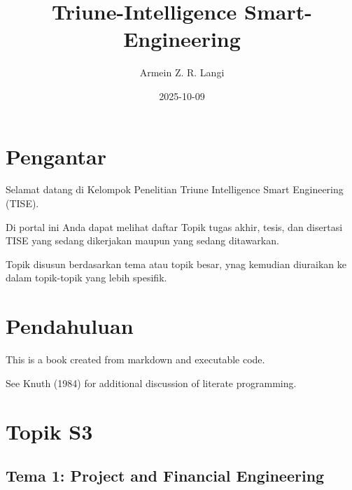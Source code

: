 \documentclass[
  letterpaper,
  DIV=11,
  numbers=noendperiod]{scrreprt}
\title{Triune-Intelligence Smart-Engineering}
\author{Armein Z. R. Langi}
\date{2025-10-09}
\renewcommand*\contentsname{Table of contents}
\newcommand\contentsname{Table of contents}
\begin{document}
\maketitle

\renewcommand*\contentsname{Table of contents}
{
\hypersetup{linkcolor=}
\setcounter{tocdepth}{2}
\tableofcontents
}


\chapter*{Pengantar}\label{pengantar}


Selamat datang di Kelompok Penelitian Triune Intelligence Smart
Engineering (TISE).

Di portal ini Anda dapat melihat daftar Topik tugas akhir, tesis, dan
disertasi TISE yang sedang dikerjakan maupun yang sedang ditawarkan.

Topik disusun berdasarkan tema atau topik besar, ynag kemudian diuraikan
ke dalam topik-topik yang lebih spesifik.


\chapter{Pendahuluan}\label{pendahuluan}

This is a book created from markdown and executable code.

See Knuth (1984) for additional discussion of literate programming.


\chapter{Topik S3}\label{topik-s3}

\section{Tema 1: Project and Financial
Engineering}\label{tema-1-project-and-financial-engineering}
\end{document}
